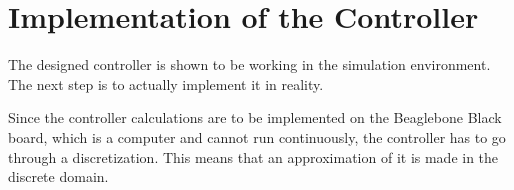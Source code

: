 \section{Implementation of the Controller}\label{impController}
The designed controller is shown to be working in the simulation environment. The next step is to actually implement it in reality.

Since the controller calculations are to be implemented on the Beaglebone Black board, which is a computer and cannot run continuously, the controller has to go through a discretization. This means that an approximation of it is made in the discrete domain.